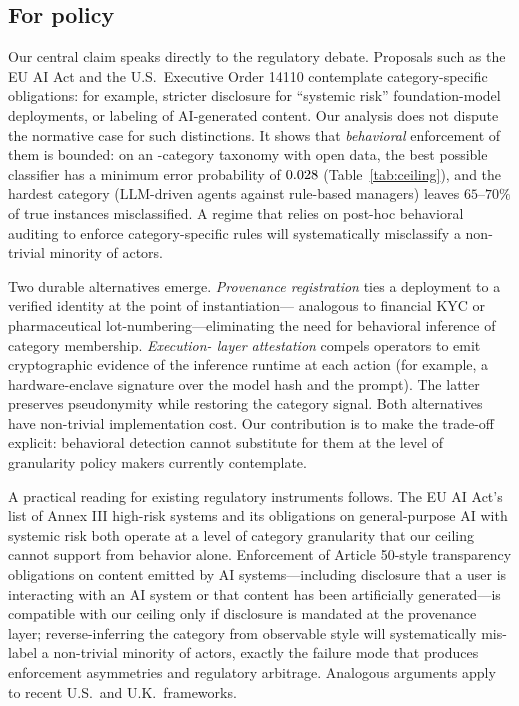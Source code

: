 \documentclass[11pt,a4paper]{article}
\begin{document}
\subsection*{For policy}

Our central claim speaks directly to the regulatory debate. Proposals
such as the EU AI Act\cite{eu_ai_act_2024} and the U.S.\ Executive Order
14110\cite{us_eo_14110} contemplate category-specific obligations: for
example, stricter disclosure for ``systemic risk'' foundation-model
deployments, or labeling of AI-generated content. Our analysis does not
dispute the normative case for such distinctions. It shows that
\emph{behavioral} enforcement of them is bounded: on an \nClasses-category
taxonomy with open data, the best possible classifier has a minimum error
probability of $0.028$ (Table~\ref{tab:ceiling}), and the hardest category (LLM-driven
agents against rule-based managers) leaves $65$--$70\%$ of true
instances misclassified. A regime that relies on
post-hoc behavioral auditing to enforce category-specific rules will
systematically misclassify a non-trivial minority of actors.

Two durable alternatives emerge. \emph{Provenance registration} ties a
deployment to a verified identity at the point of instantiation---
analogous to financial KYC or pharmaceutical lot-numbering---eliminating
the need for behavioral inference of category membership. \emph{Execution-
layer attestation} compels operators to emit cryptographic evidence of
the inference runtime at each action (for example, a hardware-enclave
signature over the model hash and the prompt\cite{costan2016intelsgx,tramer2018,boneh2020zkp,sun2023attestedinference}).
The latter preserves pseudonymity while restoring the category signal.
Both alternatives have non-trivial implementation cost. Our contribution
is to make the trade-off explicit: behavioral detection cannot substitute
for them at the level of granularity policy makers currently contemplate.

A practical reading for existing regulatory instruments follows. The EU
AI Act's list of Annex III high-risk systems and its obligations on
general-purpose AI with systemic risk both operate at a level of
category granularity that our ceiling cannot support from behavior alone.
Enforcement of Article 50-style transparency obligations on content
emitted by AI systems---including disclosure that a user is interacting
with an AI system or that content has been artificially generated---is
compatible with our ceiling only if disclosure is mandated at the
provenance layer; reverse-inferring the category from observable style
will systematically mis-label a non-trivial minority of actors, exactly
the failure mode that produces enforcement asymmetries and regulatory
arbitrage. Analogous arguments apply to recent U.S.\ and U.K.\
frameworks\cite{us_eo_14110,uk_ai_regulation_2023,anderljung2023frontier,bengio2024managing}.
\end{document}
